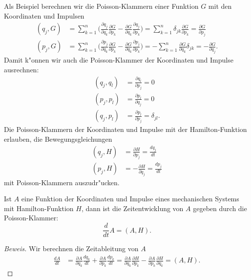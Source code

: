 Als Beispiel berechnen wir die Poisson-Klammern einer Funktion $G$
mit den Koordinaten und Impulsen
\begin{align*}
(q_j,G)
&=
\sum_{k=1}^n\biggl(
\frac{\partial q_j}{\partial q_k}\frac{\partial G}{\partial p_k}
-
\frac{\partial G}{\partial q_k}\frac{\partial q_j}{\partial p_k}
\biggr)
=
\sum_{k=1}^n\delta_{jk}\frac{\partial G}{\partial p_k}
=
\frac{\partial G}{\partial p_j}
\\
(p_j,G)
&=
\sum_{k=1}^n\biggl(
\frac{\partial p_j}{\partial q_k}\frac{\partial G}{\partial p_k}
-
\frac{\partial G}{\partial q_k}\frac{\partial p_j}{\partial p_k}
\biggr)
=
-\sum_{k=1}^n
\frac{\partial G}{\partial q_k}\delta_{jk}
=
-\frac{\partial G}{\partial q_j}.
\end{align*}
Damit k"onnen wir auch die Poisson-Klammer der Koordinaten und Impulse
ausrechnen:
\begin{align*}
(q_j,q_l)
&=
\frac{\partial q_l}{\partial p_j}
=
0
\\
(p_j,p_l)
&=
\frac{\partial p_l}{\partial q_j}
=
0
\\
(q_j,p_l)
&=
\frac{\partial p_l}{\partial p_j}
=\delta_{jl}.
\end{align*}
Die Poisson-Klammern der Koordinaten und Impulse mit der Hamilton-Funktion
erlauben, die Bewegungsgleichungen
\begin{align*}
(q_j,H)
&=
\frac{\partial H}{\partial p_j} = \frac{dq_j}{dt}
\\
(p_j,H)
&=
-\frac{\partial H}{\partial q_j} = \frac{dp_j}{dt}
\end{align*}
mit Poisson-Klammern auszudr"ucken.

\begin{satz}
\label{skript:zeitentwicklung-observable-klassisch}
Ist $A$ eine Funktion der Koordinaten und Impulse eines mechanischen Systems
mit Hamilton-Funktion $H$, dann ist die Zeitentwicklung von $A$ gegeben
durch die Poisson-Klammer:
\begin{equation}
\frac{d}{dt}A
=
(A,H).
\label{skript:zeitentwicklung-poisson}
\end{equation}
\end{satz}

\begin{proof}[Beweis]
Wir berechnen die Zeitableitung von $A$
\begin{align*}
\frac{dA}{dt}
&=
\frac{\partial A}{\partial q_k}\frac{dq_k}{dt}
+
\frac{\partial A}{\partial p_k}\frac{dp_k}{dt}
=
\frac{\partial A}{\partial q_k}\frac{\partial H}{\partial p_k}
-
\frac{\partial A}{\partial p_k}\frac{\partial H}{\partial q_k}
=
(A,H).
\end{align*}
\end{proof}

